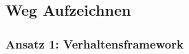 \subsection{Weg Aufzeichnen}
\label{weg-aufzeichnen}

\subsubsection{Ansatz 1: Verhaltensframework}

